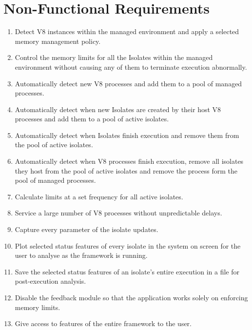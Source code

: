\documentclass{l4proj}
\begin{document}
\section{Non-Functional Requirements}
\begin{enumerate}
\item Detect V8 instances within the managed environment and apply a selected memory management policy.
\item Control the memory limits for all the Isolates within the managed environment without causing any of them to terminate execution abnormally.
\item Automatically detect new V8 processes and add them to a pool of managed processes.
\item Automatically detect when new Isolates are created by their host V8 processes and add them to a pool of active isolates.
\item Automatically detect when Isolates finish execution and remove them from the pool of active isolates.
\item Automatically detect when V8 processes finish execution, remove all isolates they host from the pool of active isolates and remove the process form the pool of managed processes.
\item Calculate limits at a set frequency for all active isolates.
\item Service a large number of V8 processes without unpredictable delays.
\item Capture every parameter of the isolate updates.
\item Plot selected status features of every isolate in the system on screen for the user to analyse as the framework is running.
\item Save the selected status features of an isolate's entire execution in a file for post-execution analysis.
\item Disable the feedback module so that the application works solely on enforcing memory limits.
\item Give access to features of the entire framework to the user.
\end{enumerate}
\end{document}

